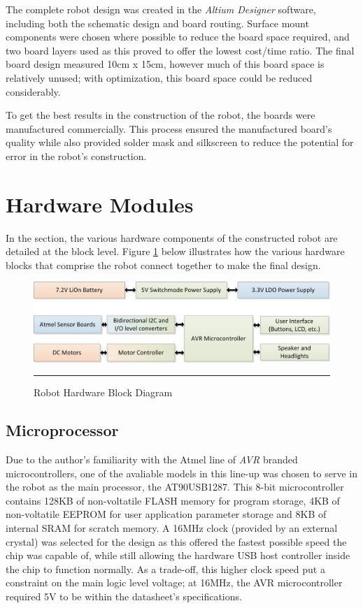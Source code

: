The complete robot design was created in the \textit{Altium Designer} software, including both the schematic design and board routing. Surface mount components were chosen where possible to reduce the board space required, and two board layers used as this proved to offer the lowest cost/time ratio. The final board design measured 10cm x 15cm, however much of this board space is relatively unused; with optimization, this board space could be reduced considerably.

To get the best results in the construction of the robot, the boards were manufactured commercially. This process ensured the manufactured board's quality while also provided solder mask and silkscreen to reduce the potential for error in the robot's construction.

\section{Hardware Modules}

In the section, the various hardware components of the constructed robot are detailed at the block level. Figure \ref{fig:robotblockhw} below illustrates how the various hardware blocks that comprise the robot connect together to make the final design.

\vspace{1em}

\begin{figure}[H]
	\centering
		\includegraphics[width=140mm]{./Figures/BlockDiagram.png}
	\rule{35em}{0.5pt}
	\caption[Hardware Block Diagram]{Robot Hardware Block Diagram}
	\label{fig:robotblockhw}
\end{figure}

\subsection{Microprocessor}

Due to the author's familiarity with the Atmel line of \textit{AVR} branded microcontrollers, one of the avaliable models in this line-up was chosen to serve in the robot as the main processor, the AT90USB1287. This 8-bit microcontroller contains 128KB of non-voltatile FLASH memory for program storage, 4KB of non-voltatile EEPROM for user application parameter storage and 8KB of internal SRAM for scratch memory. A 16MHz clock (provided by an external crystal) was selected for the design as this offered the fastest possible speed the chip was capable of, while still allowing the hardware USB host controller inside the chip to function normally. As a trade-off, this higher clock speed put a constraint on the main logic level voltage; at 16MHz, the AVR microcontroller required 5V to be within the datasheet's specifications.

